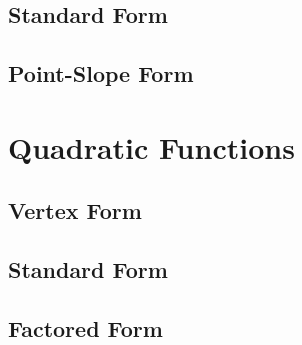 \documentclass[11pt]{article}
\begin{document}
	\subsection{Standard Form}
	\subsection{Point-Slope Form}
\section{Quadratic Functions}
	\subsection{Vertex Form}
	\subsection{Standard Form}
	\subsection{Factored Form}
\end{document}
